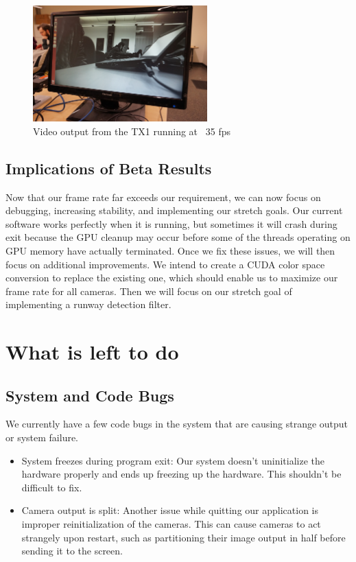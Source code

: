 \documentclass[letterpaper,10pt,titlepage]{IEEEtran}
\begin{document}
\begin{figure}[!ht]
  \caption{Video output from the TX1 running at ~35 fps}
	  \centering
		    \includegraphics[width=0.6\textwidth]{images/exampleOutputNormalBeta.jpg}
				\end{figure}
  
  \subsection{Implications of Beta Results}
  Now that our frame rate far exceeds our requirement, we can now focus on debugging, increasing stability, and implementing our stretch goals. Our current software works perfectly when it is running, but sometimes it will crash during exit because the GPU cleanup may occur before some of the threads operating on GPU memory have actually terminated. Once we fix these issues, we will then focus on additional improvements. We intend to create a CUDA color space conversion to replace the existing one, which should enable us to maximize our frame rate for all cameras. Then we will focus on our stretch goal of implementing a runway detection filter.

\section{What is left to do}
  \subsection{System and Code Bugs}
	We currently have a few code bugs in the system that are causing strange output or system failure.\\
	\begin{itemize}
		\item System freezes during program exit: Our system doesn't uninitialize the hardware properly and ends up freezing up the hardware. This shouldn't be difficult to fix.
		\item Camera output is split: Another issue while quitting our application is improper reinitialization of the cameras. This can cause cameras to act strangely upon restart, such as partitioning their image output in half before sending it to the screen.
	\end{itemize}
	
\end{document}
